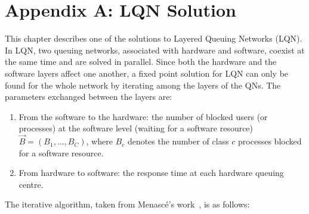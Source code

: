 

 \chapter{Appendix A: LQN Solution} 
 \label{ch:appendix1} 
This chapter describes one of the solutions to Layered Queuing Networks (LQN). 
In LQN, two queuing networks, associated with hardware and software, coexist at the same time and are solved in parallel. 
 Since both the hardware and the software layers affect one another, a fixed point solution for LQN can only be found for the whole network \cite{petriu_approximate_1991} by iterating among the layers of the QNs. The parameters exchanged between the layers are:  
 \begin{enumerate} 
 \item From the software to the hardware: the number of blocked users (or processes) at the software level (waiting for a software resource) $\vec{B}=(B_1, \ldots , B_C)$, 
 where $B_c$  denotes the number of class $c$ processes blocked for a software resource. 
 \item From hardware to software: the response time at each hardware queuing centre. 
 \end{enumerate}
 The iterative algorithm, taken from Menasc{\'e}'s work~\cite{menasce2004performance,menasce2002simple}, is as follows: 
